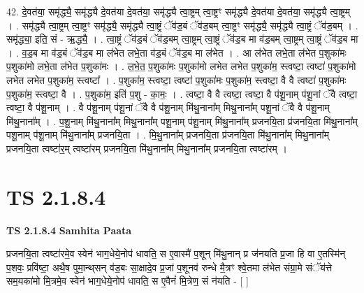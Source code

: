 \documentclass[17pt]{extarticle}
\begin{document}
42. दे॒वत॑या॒ समृ॑द्ध्यै॒ समृ॑द्ध्यै दे॒वत॑या दे॒वत॑या॒ समृ॑द्ध्यै त्वा॒ष्ट्रम् त्वा॒ष्ट्रꣳ समृ॑द्ध्यै दे॒वत॑या दे॒वत॑या॒ समृ॑द्ध्यै त्वा॒ष्ट्रम् । . समृ॑द्ध्यै त्वा॒ष्ट्रम् त्वा॒ष्ट्रꣳ समृ॑द्ध्यै॒ समृ॑द्ध्यै त्वा॒ष्ट्रं ॅव॑ड॒बं ॅव॑ड॒बम् त्वा॒ष्ट्रꣳ समृ॑द्ध्यै॒ समृ॑द्ध्यै त्वा॒ष्ट्रं ॅव॑ड॒बम् । . समृ॑द्ध्या॒ इति॒ सं - ऋ॒द्ध्यै॒ । . त्वा॒ष्ट्रं ॅव॑ड॒बं ॅव॑ड॒बम् त्वा॒ष्ट्रम् त्वा॒ष्ट्रं ॅव॑ड॒ब मा व॑ड॒बम् त्वा॒ष्ट्रम् त्वा॒ष्ट्रं ॅव॑ड॒ब मा । . व॒ड॒ब मा व॑ड॒बं ॅव॑ड॒ब मा ल॑भेत लभे॒ता व॑ड॒बं ॅव॑ड॒ब मा ल॑भेत । . आ ल॑भेत लभे॒ता ल॑भेत प॒शुका॑मः प॒शुका॑मो लभे॒ता ल॑भेत प॒शुका॑मः । . ल॒भे॒त॒ प॒शुका॑मः प॒शुका॑मो लभेत लभेत प॒शुका॑म॒ स्त्वष्टा॒ त्वष्टा॑ प॒शुका॑मो लभेत लभेत प॒शुका॑म॒ स्त्वष्टा᳚ । . प॒शुका॑म॒ स्त्वष्टा॒ त्वष्टा॑ प॒शुका॑मः प॒शुका॑म॒ स्त्वष्टा॒ वै वै त्वष्टा॑ प॒शुका॑मः प॒शुका॑म॒ स्त्वष्टा॒ वै । . प॒शुका॑म॒ इति॑ प॒शु - का॒मः॒ । . त्वष्टा॒ वै वै त्वष्टा॒ त्वष्टा॒ वै प॑शू॒नाम् प॑शू॒नां ॅवै त्वष्टा॒ त्वष्टा॒ वै प॑शू॒नाम् । . वै प॑शू॒नाम् प॑शू॒नां ॅवै वै प॑शू॒नाम् मि॑थु॒नाना᳚म् मिथु॒नाना᳚म् पशू॒नां ॅवै वै प॑शू॒नाम् मि॑थु॒नाना᳚म् । . प॒शू॒नाम् मि॑थु॒नाना᳚म् मिथु॒नाना᳚म् पशू॒नाम् प॑शू॒नाम् मि॑थु॒नाना᳚म् प्रजनयि॒ता प्र॑जनयि॒ता मि॑थु॒नाना᳚म् पशू॒नाम् प॑शू॒नाम् मि॑थु॒नाना᳚म् प्रजनयि॒ता । . मि॒थु॒नाना᳚म् प्रजनयि॒ता प्र॑जनयि॒ता मि॑थु॒नाना᳚म् मिथु॒नाना᳚म् प्रजनयि॒ता त्वष्टा॑र॒म् त्वष्टा॑रम् प्रजनयि॒ता मि॑थु॒नाना᳚म् मिथु॒नाना᳚म् प्रजनयि॒ता त्वष्टा॑रम् । \newline
\pagebreak
{}

\section{ TS 2.1.8.4 }

\textbf{TS 2.1.8.4 } \newline
\textbf{Samhita Paata} \newline

प्रजनयि॒ता त्वष्टा॑रमे॒व स्वेन॑ भाग॒धेये॒नोप॑ धावति॒ स ए॒वास्मै॑ प॒शून् मि॑थु॒नान् प्र ज॑नयति प्र॒जा हि वा ए॒तस्मि॑न् प॒शवः॒ प्रवि॑ष्टा॒ अथै॒ष पुमा॒न्थ्‌सन् व॑ड॒बः सा॒क्षादे॒व प्र॒जां प॒शूनव॑ रुन्धे मै॒त्रꣳ श्वे॒तमा ल॑भेत संग्रा॒मे संॅय॑त्ते सम॒यका॑मो मि॒त्रमे॒व स्वेन॑ भाग॒धेये॒नोप॑ धावति॒ स ए॒वैनं॑ मि॒त्रेण॒ सं न॑यति - [  ] \newline
\end{document}
